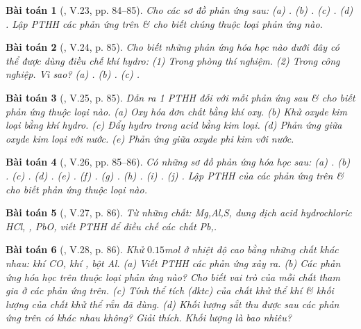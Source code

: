 \documentclass{article}
\newtheorem{baitoan}{Bài toán}
\begin{document}
\begin{baitoan}[\cite{Truong_BTNC_Hoa_Hoc_8_2022}, V.23, pp. 84--85]
	Cho các sơ đồ phản ứng sau: (a) \emph{}. (b) \emph{}. (c) \emph{}. (d) \emph{}. Lập PTHH các phản ứng trên \& cho biết chúng thuộc loại phản ứng nào.
\end{baitoan}

\begin{baitoan}[\cite{Truong_BTNC_Hoa_Hoc_8_2022}, V.24, p. 85]
	Cho biết những phản ứng hóa học nào dưới đây có thể được dùng điều chế khí hydro: (1) Trong phòng thí nghiệm. (2) Trong công nghiệp. Vì sao? (a) \emph{}. (b) \emph{}. (c) \emph{}.
\end{baitoan}

\begin{baitoan}[\cite{Truong_BTNC_Hoa_Hoc_8_2022}, V.25, p. 85]
	Dẫn ra 1 PTHH đối với mỗi phản ứng sau \& cho biết phản ứng thuộc loại nào. (a) Oxy hóa đơn chất bằng khí oxy. (b) Khử oxyde kim loại bằng khí hydro. (c) Đẩy hydro trong acid bằng kim loại. (d) Phản ứng giữa oxyde kim loại với nước. (e) Phản ứng giữa oxyde phi kim với nước.
\end{baitoan}

\begin{baitoan}[\cite{Truong_BTNC_Hoa_Hoc_8_2022}, V.26, pp. 85--86]
	Có những sơ đồ phản ứng hóa học sau: (a) \emph{}. (b) \emph{}. (c) \emph{}. (d) \emph{}. (e) \emph{}. (f) \emph{}. (g) \emph{}. (h) \emph{}. (i) \emph{}. (j) \emph{}. Lập PTHH của các phản ứng trên \& cho biết phản ứng thuộc loại nào.
\end{baitoan}

\begin{baitoan}[\cite{Truong_BTNC_Hoa_Hoc_8_2022}, V.27, p. 86]
	Từ những chất: \emph{Mg,Al,S}, dung dịch acid hydrochloric \emph{HCl, , PbO}, viết PTHH để điều chế các chất \emph{Pb,}.
\end{baitoan}

\begin{baitoan}[\cite{Truong_BTNC_Hoa_Hoc_8_2022}, V.28, p. 86]
	Khử $0.15$\emph{mol } ở nhiệt độ cao bằng những chất khác nhau: khí \emph{CO}, khí \emph{}, bột \emph{Al}. (a) Viết PTHH các phản ứng xảy ra. (b) Các phản ứng hóa học trên thuộc loại phản ứng nào? Cho biết vai trò của mỗi chất tham gia ở các phản ứng trên. (c) Tính thể tích (đktc) của chất khử thể khí \& khối lượng của chất khử thể rắn đã dùng. (d) Khối lượng sắt thu được sau các phản ứng trên có khác nhau không? Giải thích. Khối lượng là bao nhiêu?
\end{baitoan}
\end{document}
